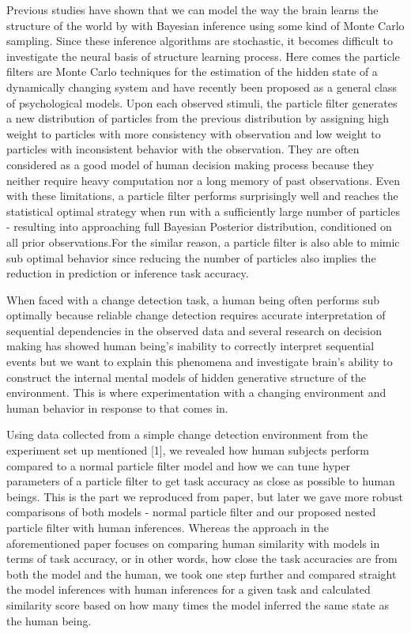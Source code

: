 \documentclass[12pt,letterpaper]{article}
\begin{document}
Previous studies have shown that we can model the way the brain learns the structure of the world by with Bayesian inference using some kind of Monte Carlo sampling. Since these inference algorithms are stochastic, it becomes difficult to investigate the neural basis of structure learning process. Here comes the particle filters are Monte Carlo techniques for the estimation of the hidden state of a dynamically changing system 
and have recently been proposed as a general class of psychological models. Upon each observed stimuli, the particle filter generates a new distribution of particles from the previous distribution by assigning high weight to particles with more consistency with observation and low weight to particles with inconsistent behavior with the observation. They are often considered as a good model of human decision making process because they neither require heavy computation nor a long memory of past observations. Even with these limitations, a particle filter performs surprisingly well and reaches the statistical optimal strategy when run with a sufficiently large number of particles - resulting into approaching full Bayesian Posterior distribution, conditioned on all prior observations.For the similar reason, a particle filter is also able to mimic sub optimal behavior since reducing the number of particles also implies the reduction in prediction or inference task accuracy. 


When faced with a change detection task, a human being often performs sub optimally because reliable change detection requires accurate interpretation of sequential dependencies in the observed data and several research on decision making has showed human being's inability to correctly interpret sequential events but we want to explain this phenomena and investigate brain's ability to construct the internal mental models of hidden generative structure of the environment. This is where experimentation with a changing environment and human behavior in response to that comes in. 


Using data collected from a simple change detection environment from the experiment set up mentioned [1], we revealed how human subjects perform compared to a normal particle filter model and how we can tune hyper parameters of a particle filter to get task accuracy as close as possible to human beings. This is the part we reproduced from paper, but later we gave more robust comparisons of both models - normal particle filter and our proposed nested particle filter with human inferences. Whereas the approach in the aforementioned paper focuses on comparing human similarity with models in terms of task accuracy, or in other words, how close the task accuracies are from both the model and the human, we took one step further and compared straight the model inferences with human inferences for a given task and calculated similarity score based on how many times the model inferred the same state as the human being. 
\end{document}
